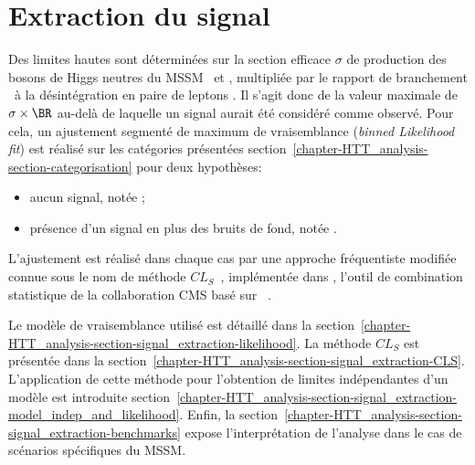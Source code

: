 \section{Extraction du signal}\label{chapter-HTT_analysis-section-signal_extraction}
Des limites hautes sont déterminées sur la section efficace $\sigma$ de production des bosons de Higgs neutres du MSSM \Higgs\ et \HiggsA, multipliée par le rapport de branchement \BR\ à la désintégration en paire de leptons \tau.
Il s'agit donc de la valeur maximale de $\sigma\times\BR$ au-delà de laquelle un signal aurait été considéré comme observé.
Pour cela, un ajustement segmenté de maximum de vraisemblance (\emph{binned Likelihood fit}) est réalisé sur les catégories présentées section~\ref{chapter-HTT_analysis-section-categorisation} pour deux hypothèses:
\begin{itemize}
\item aucun signal, notée \hypB;
\item présence d'un signal en plus des bruits de fond, notée \hypSB.
\end{itemize}
L'ajustement est réalisé dans chaque cas par une approche fréquentiste modifiée connue sous le nom de méthode $CL_S$~\cite{Junk:1999kv,CLs_method,Read_2002}, implémentée dans \COMBINE, l'outil de combination statistique de la collaboration CMS basé sur \ROOSTATS~\cite{RooStats}.
\par
Le modèle de vraisemblance utilisé est détaillé dans la section~\ref{chapter-HTT_analysis-section-signal_extraction-likelihood}.
La méthode $CL_S$ est présentée dans la section~\ref{chapter-HTT_analysis-section-signal_extraction-CLS}.
L'application de cette méthode pour l'obtention de limites indépendantes d'un modèle est introduite section~\ref{chapter-HTT_analysis-section-signal_extraction-model_indep_and_likelihood}.
Enfin, la section~\ref{chapter-HTT_analysis-section-signal_extraction-benchmarks} expose l'interprétation de l'analyse dans le cas de scénarios spécifiques du MSSM.





